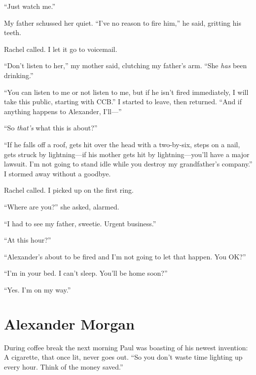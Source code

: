 ``Just watch me.''

My father schussed her quiet. ``I've no reason to fire him,'' he said,
gritting his teeth.

Rachel called. I let it go to voicemail.

``Don't listen to her,'' my mother said, clutching my father's arm.
``She \emph{has} been drinking.''

``You can listen to me or not listen to me, but if he isn't fired
immediately, I will take this public, starting with CCB.'' I started to
leave, then returned. ``And if anything happens to Alexander, I'll---''

``So \emph{that's} what this is about?''

``If he falls off a roof, gets hit over the head with a two-by-six,
steps on a nail, gets struck by lightning---if his mother gets hit by
lightning---you'll have a major lawsuit. I'm not going to stand idle
while you destroy my grandfather's company.'' I stormed away without a
goodbye.

Rachel called. I picked up on the first ring.

``Where are you?'' she asked, alarmed.

``I had to see my father, sweetie. Urgent business.''

``At this hour?''

``Alexander's about to be fired and I'm not going to let that happen.
You OK?''

``I'm in your bed. I can't sleep. You'll be home soon?''

``Yes. I'm on my way.''

\chapter{Alexander Morgan}

\titlemark

During coffee break the next morning Paul was boasting of his newest
invention: A cigarette, that once lit, never goes out. ``So you don't
waste time lighting up every hour. Think of the money saved.''

